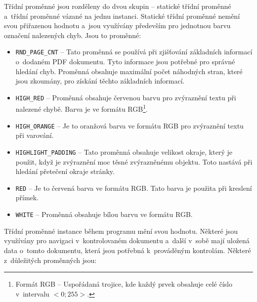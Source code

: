 Třídní proměnné jsou rozděleny do dvou skupin -- statické třídní proměnné
a~třídní proměnné vázané na jednu instanci. Statické třídní proměnné nemění 
svou přiřazenou hodnotu a~jsou využívány především pro jednotnou barvu označení
nalezených chyb. Jsou to proměnné:
\begin{itemize}
    \item \texttt{RND\_PAGE\_CNT} -- Tato proměnná se používá při zjišťování
    základních informací o~dodaném PDF dokumentu. Tyto informace jsou potřebné
    pro správné hledání chyb. Proměnná obsahuje maximální počet náhodných stran,
    které jsou zkoumány, pro získání těchto základních informací.

    \item \texttt{HIGH\_RED} -- Proměnná obsahuje červenou barvu pro zvýraznění
    textu při nalezené chybě. Barva je ve formátu RGB\footnote{
        Formát RGB -- Uspořádaná trojice, kde každý prvek obsahuje celé číslo
        v~intervalu $<0;255>$.
    }.

    \item \texttt{HIGH\_ORANGE} -- Je to oranžová barva ve formátu RGB pro
    zvýraznění textu při varování.
    
    \item \texttt{HIGHLIGHT\_PADDING} -- Tato proměnná obsahuje velikost okraje,
    který je použit, když je zvýraznění moc těsné zvýrazněnému objektu. Toto
    nastává při hledání přetečení okraje stránky.
    
    \item \texttt{RED} -- Je to červená barva ve formátu RGB. Tato barva je
    použita při kreslení přímek.
    
    \item \texttt{WHITE} -- Proměnná obsahuje bílou barvu ve formátu RGB.
\end{itemize}
Třídní proměnné instance během programu mění svou hodnotu. Některé jsou využívány
pro navigaci v~kontrolovaném dokumentu a~další v~sobě mají uložená data
o~tomto dokumentu, která jsou potřebná k~prováděným kontrolám. Některé z~důležitých
proměnných jsou:

